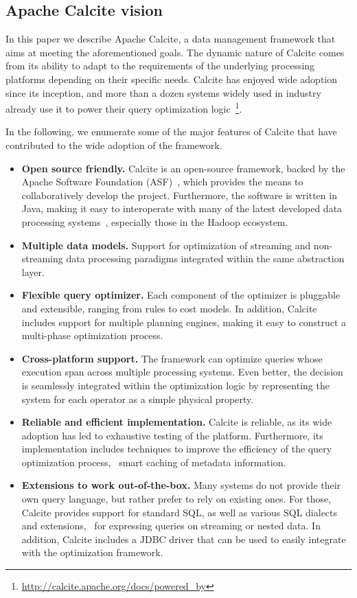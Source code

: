 \subsection{Apache Calcite vision}
\label{subsec:vision}

In this paper we describe Apache Calcite, a data management framework that aims at meeting the aforementioned goals. The dynamic nature of Calcite comes from its ability to adapt to the requirements of the underlying processing platforms depending on their specific needs. Calcite has enjoyed wide adoption since its inception, and more than a dozen systems widely used in industry already use it to power their query optimization logic~\footnote{\url{http://calcite.apache.org/docs/powered_by}}.

In the following, we enumerate some of the major features of Calcite that have contributed to the wide adoption of the framework.

\begin{itemize}
	\item\textbf{Open source friendly.} Calcite is an open-source framework, backed by the Apache Software Foundation (ASF)~\cite{asf:website}, which provides the means to collaboratively develop the project. Furthermore, the software is written in Java, making it easy to interoperate with many of the latest developed data processing systems~\cite{website:Drill,website:Flink,website:Hive,website:Kylin,website:Samza}, especially those in the Hadoop ecosystem.
	\item\textbf{Multiple data models.} Support for optimization of streaming and non-streaming data processing paradigms integrated within the same abstraction layer.
	\item\textbf{Flexible query optimizer.} Each component of the optimizer is pluggable and extensible, ranging from rules to cost models. In addition, Calcite includes support for multiple planning engines, making it easy to construct a multi-phase optimization process.
	\item\textbf{Cross-platform support.} The framework can optimize queries whose execution span across multiple processing systems. Even better, the decision is seamlessly integrated within the optimization logic by representing the system for each operator as a simple physical property.
	\item\textbf{Reliable and efficient implementation.} Calcite is reliable, as its wide adoption has led to exhaustive testing of the platform. Furthermore, its implementation includes techniques to improve the efficiency of the query optimization process, \eg\ smart caching of metadata information.
	\item\textbf{Extensions to work out-of-the-box.} Many systems do not provide their own query language, but rather prefer to rely on existing ones. For those, Calcite provides support for standard SQL, as well as various SQL dialects and extensions, \eg\ for expressing queries on streaming or nested data. In addition, Calcite includes a JDBC driver that can be used to easily integrate with the optimization framework.
\end{itemize}
